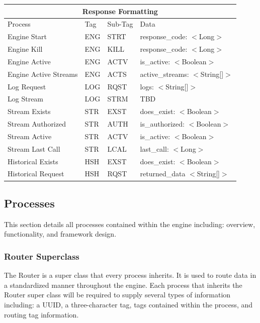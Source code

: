 \documentclass{article}
\begin{document}
\begin{center}
\begin{tabular}{ | p{5cm} || p{2cm} | p{2cm} | p{6cm} | }
\hline
\multicolumn{4}{|c|}{Response Formatting}\\
\hline
Process & Tag & Sub-Tag & Data\\
\hline
Engine Start & ENG & STRT & response\_code: $<$Long$>$\\
\hline
Engine Kill & ENG & KILL & response\_code: $<$Long$>$\\
\hline
Engine Active & ENG & ACTV & is\_active: $<$Boolean$>$\\
\hline
Engine Active Streams & ENG & ACTS & active\_streams: $<$String[]$>$\\
\hline
Log Request & LOG & RQST & logs: $<$String[]$>$\\
\hline
Log Stream & LOG & STRM & TBD\\
\hline
Stream Exists & STR & EXST & does\_exist: $<$Boolean$>$\\
\hline
Stream Authorized & STR & AUTH & is\_authorized: $<$Boolean$>$\\
\hline
Stream Active & STR & ACTV & is\_active: $<$Boolean$>$\\
\hline
Stream Last Call & STR & LCAL & last\_call: $<$Long$>$\\
\hline
Historical Exists & HSH & EXST & does\_exist: $<$Boolean$>$\\
\hline
Historical Request & HSH & RQST & returned\_data $<$String[]$>$\\ 
\hline
\end{tabular}
\end{center}

\subsection{Processes}
This section details all processes contained within the engine including: overview, functionality, and framework design.

\subsubsection{Router Superclass}
The Router is a super class that every process inherits. It is used to route data in a standardized manner throughout the engine. Each process that inherits the Router super class will be required to supply several types of information including: a UUID, a three-character tag, tags contained within the process, and routing tag information.
\end{document}
